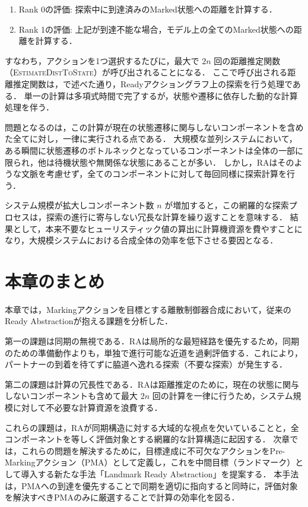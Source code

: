 \documentclass[a4paper,11pt,oneside,openany,report,dvipdfmx]{jsbook}
\newcommand\aref[1]{\hyperref[#1]{\prettyref{#1}}}
\begin{document}
\begin{enumerate}
  \item Rank 0の評価: 探索中に到達済みのMarked状態への距離を計算する．
  \item Rank 1の評価: 上記が到達不能な場合，モデル上の全てのMarked状態への距離を計算する．
\end{enumerate}

すなわち，アクションを1つ選択するたびに，最大で $2n$ 回の距離推定関数（\textsc{Estimate\-Dist\-To\-State}）が呼び出されることになる．
ここで呼び出される距離推定関数は，\aref{chap:background}で述べた通り，Readyアクショングラフ上の探索を行う処理である．
単一の計算は多項式時間で完了するが，状態や遷移に依存した動的な計算処理を伴う．

問題となるのは，この計算が現在の状態遷移に関与しないコンポーネントを含めた全てに対し，一律に実行される点である．
大規模な並列システムにおいて，ある瞬間に状態遷移のボトルネックとなっているコンポーネントは全体の一部に限られ，他は待機状態や無関係な状態にあることが多い．
しかし，RAはそのような文脈を考慮せず，全てのコンポーネントに対して毎回同様に探索計算を行う．

システム規模が拡大しコンポーネント数 $n$ が増加すると，この網羅的な探索プロセスは，探索の進行に寄与しない冗長な計算を繰り返すことを意味する．
結果として，本来不要なヒューリスティック値の算出に計算機資源を費やすことになり，大規模システムにおける合成全体の効率を低下させる要因となる．

\section{本章のまとめ}

本章では，Markingアクションを目標とする離散制御器合成において，従来のReady Abstractionが抱える課題を分析した．

第一の課題は同期の無視である．RAは局所的な最短経路を優先するため，同期のための準備動作よりも，単独で進行可能な近道を過剰評価する．これにより，パートナーの到着を待てずに脇道へ逸れる探索（不要な探索）が発生する．

第二の課題は計算の冗長性である．RAは距離推定のために，現在の状態に関与しないコンポーネントも含めて最大 $2n$ 回の計算を一律に行うため，システム規模に対して不必要な計算資源を浪費する．

これらの課題は，RAが同期構造に対する大域的な視点を欠いていることと，全コンポーネントを等しく評価対象とする網羅的な計算構造に起因する．
次章では，これらの問題を解決するために，目標達成に不可欠なアクションをPre-Markingアクション（PMA）として定義し，これを中間目標（ランドマーク）として導入する新たな手法「Landmark Ready Abstraction」を提案する．
本手法は，PMAへの到達を優先することで同期を適切に指向すると同時に，評価対象を解決すべきPMAのみに厳選することで計算の効率化を図る．
\end{document}
